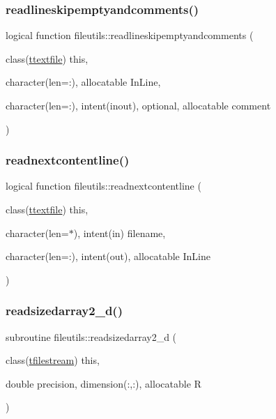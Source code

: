 \subsubsection{\texorpdfstring{readlineskipemptyandcomments()}{readlineskipemptyandcomments()}}
{\footnotesize\ttfamily logical function fileutils\+::readlineskipemptyandcomments (\begin{DoxyParamCaption}\item[{class(\mbox{\hyperlink{structfileutils_1_1ttextfile}{ttextfile}})}]{this,  }\item[{character(len=\+:), allocatable}]{In\+Line,  }\item[{character(len=\+:), intent(inout), optional, allocatable}]{comment }\end{DoxyParamCaption})\hspace{0.3cm}{\ttfamily [private]}}

\mbox{\label{namespacefileutils_ada6e0a7d8b00d257b6902c5741d737bd}} 
\subsubsection{\texorpdfstring{readnextcontentline()}{readnextcontentline()}}
{\footnotesize\ttfamily logical function fileutils\+::readnextcontentline (\begin{DoxyParamCaption}\item[{class(\mbox{\hyperlink{structfileutils_1_1ttextfile}{ttextfile}})}]{this,  }\item[{character(len=$\ast$), intent(in)}]{filename,  }\item[{character(len=\+:), intent(out), allocatable}]{In\+Line }\end{DoxyParamCaption})\hspace{0.3cm}{\ttfamily [private]}}

\mbox{\label{namespacefileutils_a0057e2b91f8c173074b68aadbe1d3e92}} 
\subsubsection{\texorpdfstring{readsizedarray2\+\_\+d()}{readsizedarray2\_d()}}
{\footnotesize\ttfamily subroutine fileutils\+::readsizedarray2\+\_\+d (\begin{DoxyParamCaption}\item[{class(\mbox{\hyperlink{structfileutils_1_1tfilestream}{tfilestream}})}]{this,  }\item[{double precision, dimension(\+:,\+:), allocatable}]{R }\end{DoxyParamCaption})\hspace{0.3cm}{\ttfamily [private]}}



